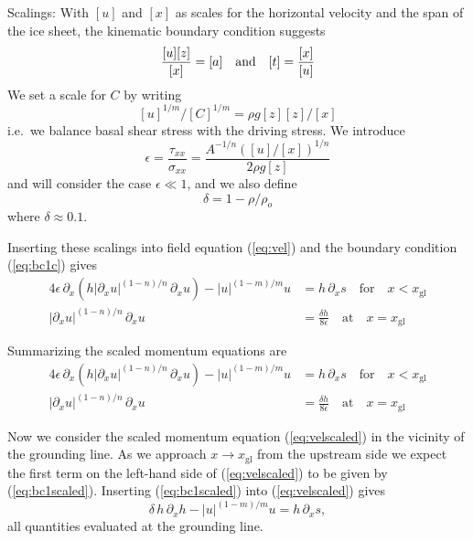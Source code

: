 \documentclass[10pt,a4paper]{book}
\newcommand{\p}{\partial}
\newcommand{\txx}{\tau_{xx}}
\newcommand{\sxx}{\sigma_{xx}}
\newcommand{\xgl}{x_{\mathrm{gl}}}
\begin{document}
Scalings: With $[u]$ and $[x]$ as scales for the horizontal velocity
and the span of the ice sheet, the kinematic boundary condition suggests
\[
\frac{[u] [z]}{[x]}= [a] \quad \hbox{and} \quad [t]=\frac{[x]}{[u]}
\]
We set a scale for $C$ by writing
\[
[u]^{1/m}/[C]^{1/m}=\rho g [z] [z]/[x]
\]
i.e.\ we balance basal shear stress with the driving stress.
We introduce
\begin{equation}
  \epsilon=\frac{\txx}{\sxx} = \frac{A^{-1/n} ([u]/[x])^{1/n}}{2 \rho g [z]} 
\end{equation}
and will consider the case $\epsilon \ll 1$, and we also define
\begin{equation}
  \delta=1-\rho/\rho_o  
\end{equation}
where $\delta\approx 0.1$.


Inserting these scalings into field equation (\ref{eq:vel}) and the boundary condition (\ref{eq:bc1c})
gives
\begin{align}
4 \epsilon \, \p_x \left (h |\p_x u|^{(1-n)/n} \, \p_x u \right ) - |u|^{(1-m)/m} u & = h \, \p_x s \quad \text{for} \quad x<\xgl \label{eq:velscaled}\\
|\p_x u|^{(1-n)/n} \, \p_x u&= \frac{\delta h}{8 \epsilon} \quad \text{at} \quad x=\xgl \label{eq:bc1scaled}
\end{align}




Summarizing the scaled momentum equations are
\begin{align}
4 \epsilon \, \p_x \left (h |\p_x u|^{(1-n)/n} \, \p_x u \right ) - |u|^{(1-m)/m} u & = h \, \p_x s \quad \text{for} \quad x<\xgl \label{eq:velscaled2}\\
|\p_x u|^{(1-n)/n} \, \p_x u&= \frac{\delta h}{8 \epsilon} \quad \text{at} \quad x=\xgl \label{eq:bc1scaledb}
\end{align}


Now we consider the scaled momentum equation (\ref{eq:velscaled}) in the
vicinity of the grounding line. As we approach $x \to \xgl$ from
the upstream side we expect the first term on the left-hand side of
(\ref{eq:velscaled}) to be given by (\ref{eq:bc1scaled}). Inserting
(\ref{eq:bc1scaled}) into (\ref{eq:velscaled}) gives
\begin{equation}
\delta  \, h \, \p_x h   - |u|^{(1-m)/m} u  = h \, \p_x s ,
\label{eq:sc3}
\end{equation}
all quantities evaluated at the grounding line.
\end{document}
